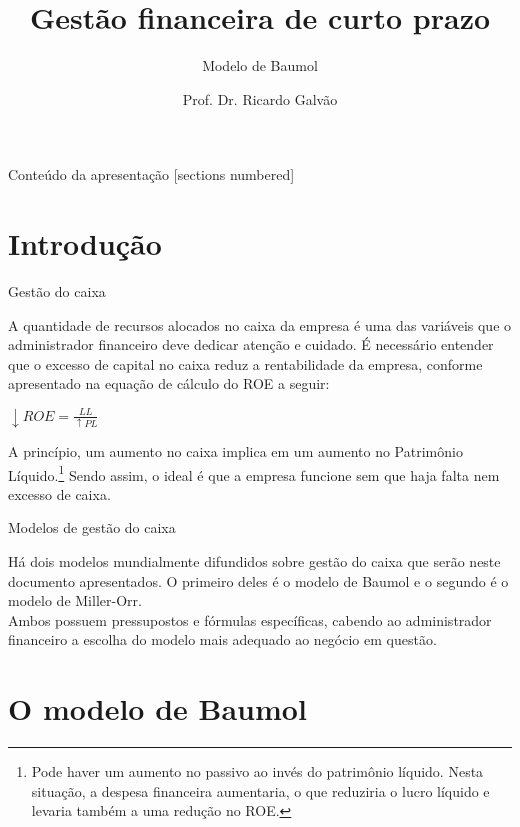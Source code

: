 \documentclass[10pt]{beamer}
\title{Gestão financeira de curto prazo}
\subtitle{Modelo de Baumol}
\date{}
\author{Prof. Dr. Ricardo Galvão}
\institute{www.rgalvao.com}
\begin{document}
\maketitle

\begin{frame}{Conteúdo da apresentação}
  [sections numbered]
  \tableofcontents[hideallsubsections]
\end{frame}

\section{Introdução}


\begin{frame}[fragile]{Gestão do caixa}

A quantidade de recursos alocados no caixa da empresa é uma das variáveis que o administrador financeiro deve dedicar atenção e cuidado. É necessário entender que o excesso de capital no caixa reduz a rentabilidade da empresa, conforme apresentado na equação de cálculo do ROE a seguir:\\
\begin{center} $ \downarrow ROE = \frac{LL}{\uparrow PL} $  \end{center}
A princípio, um aumento no caixa implica em um aumento no Patrimônio Líquido.\footnote{Pode haver um aumento no passivo ao invés do patrimônio líquido. Nesta situação, a despesa financeira aumentaria, o que reduziria o lucro líquido e levaria também a uma redução no ROE.}
Sendo assim, o ideal é que a empresa funcione sem que haja falta nem excesso de caixa.

\end{frame}


\begin{frame}[fragile]{Modelos de gestão do caixa}

Há dois modelos mundialmente difundidos sobre gestão do caixa que serão neste documento apresentados. O primeiro deles é o modelo de Baumol e o segundo é o modelo de Miller-Orr.\\
Ambos possuem pressupostos e fórmulas específicas, cabendo ao administrador financeiro a escolha do modelo mais adequado ao negócio em questão.

\end{frame}



\section{O modelo de Baumol}
\end{document}
